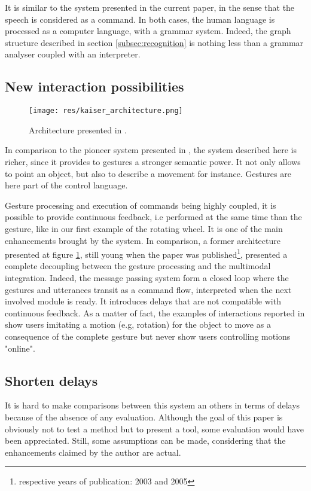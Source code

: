 \documentclass[a4paper]{article}
\begin{document}
It is similar to the system presented in the current paper, in the sense that the speech is considered as a command. In both cases, the human language is processed as a computer language, with a grammar system. Indeed, the graph structure described in section \ref{subsec:recognition} is nothing less than a grammar analyser coupled with an interpreter.

\subsection{New interaction possibilities}
\label{subsec:possibilities}

\begin{figure}
\centering
\texttt{[image: res/kaiser\_architecture.png]}
\caption{\label{fig:kaiser}Architecture presented in \cite{kaiser}.}
\end{figure}

In comparison to the pioneer system presented in \cite{putthatthere}, the system described here is richer, since it provides to gestures a stronger semantic power. It not only allows to point an object, but also to describe a movement for instance. Gestures are here part of the control language.

Gesture processing and execution of commands being highly coupled, it is possible to provide continuous feedback, i.e performed at the same time than the gesture, like in our first example of the rotating wheel. It is one of the main enhancements brought by the system. In comparison, a former architecture presented at figure \ref{fig:kaiser}, still young when the paper was published\footnote{respective years of publication: 2003 and 2005}, presented a complete decoupling between the gesture processing and the multimodal integration. Indeed, the message passing system form a closed loop where the gestures and utterances transit as a command flow, interpreted when the next involved module is ready. It introduces delays that are not compatible with continuous feedback. As a matter of fact, the examples of interactions reported in \cite{kaiser} show users imitating a motion (e.g, rotation) for the object to move as a consequence of the complete gesture but never show users controlling motions "online".

\subsection{Shorten delays}
\label{subsec:delays}
It is hard to make comparisons between this system an others in terms of delays because of the absence of any evaluation. Although the goal of this paper is obviously not to test a method but to present a tool, some evaluation would have been appreciated. Still, some assumptions can be made, considering that the enhancements claimed by the author are actual.
\end{document}
